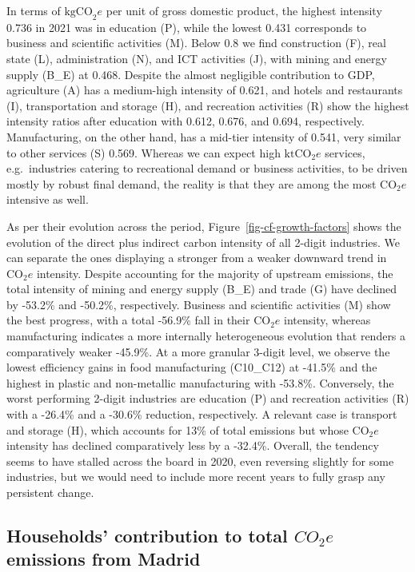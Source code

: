 \documentclass[
  10pt,
  twocolumn]{aft}
\begin{document}
In terms of \(\text{kgCO}_2e\) per unit of gross domestic product, the
highest intensity 0.736 in 2021 was in education (P), while the lowest
0.431 corresponds to business and scientific activities (M). Below 0.8
we find construction (F), real state (L), administration (N), and ICT
activities (J), with mining and energy supply (B\_E) at 0.468. Despite
the almost negligible contribution to GDP, agriculture (A) has a
medium-high intensity of 0.621, and hotels and restaurants (I),
transportation and storage (H), and recreation activities (R) show the
highest intensity ratios after education with 0.612, 0.676, and 0.694,
respectively. Manufacturing, on the other hand, has a mid-tier intensity
of 0.541, very similar to other services (S) 0.569. Whereas we can
expect high \(\text{ktCO}_2e\) services, e.g.~industries catering to
recreational demand or business activities, to be driven mostly by
robust final demand, the reality is that they are among the most
\(\text{CO}_2e\) intensive as well.

As per their evolution across the period,
Figure~\ref{fig-cf-growth-factors} shows the evolution of the direct
plus indirect carbon intensity of all 2-digit industries. We can
separate the ones displaying a stronger from a weaker downward trend in
\(\text{CO}_2e\) intensity. Despite accounting for the majority of
upstream emissions, the total intensity of mining and energy supply
(B\_E) and trade (G) have declined by -53.2\% and -50.2\%, respectively.
Business and scientific activities (M) show the best progress, with a
total -56.9\% fall in their \(\text{CO}_2e\) intensity, whereas
manufacturing indicates a more internally heterogeneous evolution that
renders a comparatively weaker -45.9\%. At a more granular 3-digit
level, we observe the lowest efficiency gains in food manufacturing
(C10\_C12) at -41.5\% and the highest in plastic and non-metallic
manufacturing with -53.8\%. Conversely, the worst performing 2-digit
industries are education (P) and recreation activities (R) with a
-26.4\% and a -30.6\% reduction, respectively. A relevant case is
transport and storage (H), which accounts for 13\% of total emissions
but whose \(\text{CO}_2e\) intensity has declined comparatively less by
a -32.4\%. Overall, the tendency seems to have stalled across the board
in 2020, even reversing slightly for some industries, but we would need
to include more recent years to fully grasp any persistent change.

\subsection{\texorpdfstring{Households' contribution to total \(CO_2e\)
emissions from
Madrid}{Households' contribution to total CO\_2e emissions from Madrid}}\label{sec-subsec-results-households}
\end{document}
